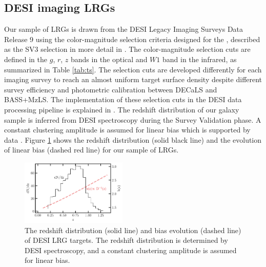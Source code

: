 \subsection{DESI imaging LRGs}
Our sample of LRGs is drawn from the DESI Legacy Imaging Surveys Data Release 9 \citep[DR9;][]{dey2018overview} using the color-magnitude selection criteria designed for the , described as the SV3 selection in more detail in \cite{zhou2022target}. The color-magnitude selection cuts are defined in the $g$, $r$, $z$ bands in the optical and $W1$ band in the infrared, as summarized in Table \ref{tab:ts}. The selection cuts are developed differently for each imaging survey to reach an almost uniform target surface density despite different survey efficiency and photometric calibration between DECaLS and BASS+MzLS. The implementation of these selection cuts in the DESI data processing pipeline is explained in \cite{myers2022}. The redshift distribution of our galaxy sample is inferred from DESI spectroscopy during the Survey Validation phase. A constant clustering amplitude is assumed for linear bias which is supported by data \citep{zhou2021clustering}. Figure \ref{fig:nz} shows the redshift distribution (solid black line) and the evolution of linear bias (dashed red line) for our sample of LRGs.

\begin{figure}
 \centering
 \includegraphics[width=0.45\textwidth]{figures/nz_lrg.pdf}
 \caption{The redshift distribution (solid line) and bias evolution (dashed line) of DESI LRG targets. The redshift distribution is determined by DESI spectroscopy, and a constant clustering amplitude is assumed for linear bias.}
 \label{fig:nz}
\end{figure}

